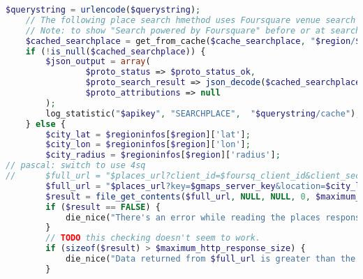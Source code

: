 \begin{lstlisting}[language=PHP,basicstyle=\tiny,caption=handle.php,label={lst:handle.php}]
	$querystring = urlencode($querystring);
	// The following place search hmethod uses Foursquare venue search service
	// Note: to show "Search powered by Foursquare" before or at search result.
	$cached_searchplace = get_from_cache($cache_searchplace, "$region/$querystring");
	if (!is_null($cached_searchplace)) {
		$json_output = array(
				$proto_status => $proto_status_ok,
				$proto_search_result => json_decode($cached_searchplace, true),
				$proto_attributions => null
		);
		log_statistic("$apikey", "SEARCHPLACE",  "$querystring/cache");
	} else {
		$city_lat = $regioninfos[$region]['lat'];
		$city_lon = $regioninfos[$region]['lon'];
		$city_radius = $regioninfos[$region]['radius'];
// pascal: switch to use 4sq
// 		$full_url = "$places_url?client_id=$foursq_client_id&client_secret=$foursq_client_secret&intent=browse&limit=10&v=20130611&ll=$city_lat,$city_lon&radius=$city_radius&query=$querystring";
		$full_url = "$places_url?key=$gmaps_server_key&location=$city_lat,$city_lon&radius=$city_radius&keyword=$querystring&types=establishment|route&sensor=true";
		$result = file_get_contents($full_url, NULL, NULL, 0, $maximum_http_response_size + 1);
		if ($result == FALSE) {
			die_nice("There's an error while reading the places response ($full_url).");
		}
		// TODO this checking doesn't seem to work.
		if (sizeof($result) > $maximum_http_response_size) {
			die_nice("Data returned from $full_url is greater than the maximum.");
		}
	

\end{lstlisting}
